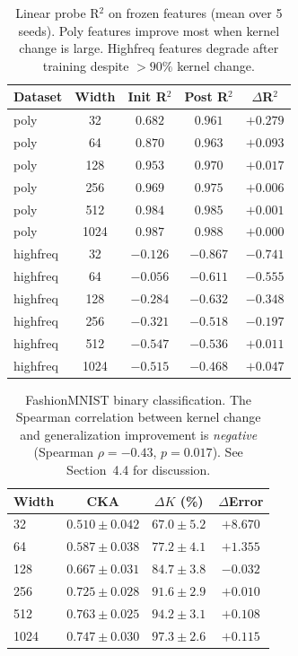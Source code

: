 \documentclass[twoside,11pt]{article}
\begin{document}
\begin{table}[htbp]
    \centering\footnotesize
        \caption{Linear probe R$^2$ on frozen features (mean over 5 seeds).  Poly features improve most when kernel change is large.  Highfreq features degrade after training despite $>90\%$ kernel change.}
    \label{tab:linear_probe}
    \begin{tabular}{lcccc}
    \toprule
    Dataset & Width & Init R$^2$ & Post R$^2$ & $\Delta$R$^2$ \\
    \midrule
    poly & 32  & $0.682$ & $0.961$ & $+0.279$ \\
    poly & 64  & $0.870$ & $0.963$ & $+0.093$ \\
    poly & 128 & $0.953$ & $0.970$ & $+0.017$ \\
    poly & 256 & $0.969$ & $0.975$ & $+0.006$ \\
    poly & 512 & $0.984$ & $0.985$ & $+0.001$ \\
    poly & 1024 & $0.987$ & $0.988$ & $+0.000$ \\
    \midrule
    highfreq & 32  & $-0.126$ & $-0.867$ & $-0.741$ \\
    highfreq & 64  & $-0.056$ & $-0.611$ & $-0.555$ \\
    highfreq & 128 & $-0.284$ & $-0.632$ & $-0.348$ \\
    highfreq & 256 & $-0.321$ & $-0.518$ & $-0.197$ \\
    highfreq & 512 & $-0.547$ & $-0.536$ & $+0.011$ \\
    highfreq & 1024 & $-0.515$ & $-0.468$ & $+0.047$ \\
    \bottomrule
    \end{tabular}
\end{table}

\begin{table}[h!]  %
    \centering\footnotesize
        \caption{FashionMNIST binary classification.  The Spearman correlation between kernel change and generalization improvement is \emph{negative} (Spearman $\rho=-0.43$, $p=0.017$).  See Section~4.4 for discussion.}
    \label{fig:fashion}
    \begin{tabular}{lccc}
    \toprule
    Width & CKA & $\Delta K$ (\%) & $\Delta$Error \\
    \midrule
    32   & $0.510\pm0.042$ & $67.0\pm5.2$  & $+8.670$ \\
    64   & $0.587\pm0.038$ & $77.2\pm4.1$  & $+1.355$ \\
    128  & $0.667\pm0.031$ & $84.7\pm3.8$  & $-0.032$ \\
    256  & $0.725\pm0.028$ & $91.6\pm2.9$  & $+0.010$ \\
    512  & $0.763\pm0.025$ & $94.2\pm3.1$  & $+0.108$ \\
    1024 & $0.747\pm0.030$ & $97.3\pm2.6$  & $+0.115$ \\
    \bottomrule
    \end{tabular}
\end{table}
\end{document}
